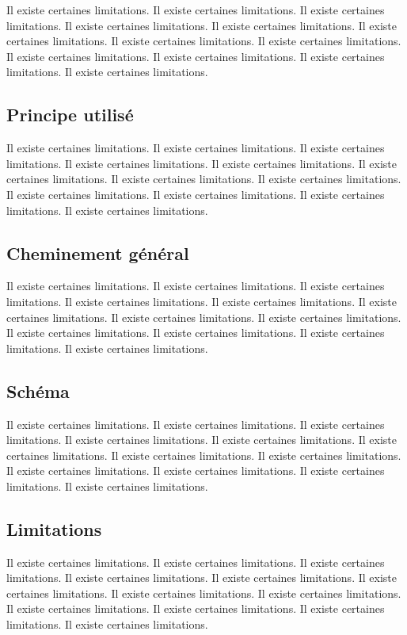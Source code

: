 \documentclass[11pt,a4paper,oneside]{report}
\begin{document}
Il existe certaines limitations.
Il existe certaines limitations.
Il existe certaines limitations.
Il existe certaines limitations.
Il existe certaines limitations.
Il existe certaines limitations.
Il existe certaines limitations.
Il existe certaines limitations.
Il existe certaines limitations.
Il existe certaines limitations.
Il existe certaines limitations.
Il existe certaines limitations.
\subsection{Principe utilisé}

Il existe certaines limitations.
Il existe certaines limitations.
Il existe certaines limitations.
Il existe certaines limitations.
Il existe certaines limitations.
Il existe certaines limitations.
Il existe certaines limitations.
Il existe certaines limitations.
Il existe certaines limitations.
Il existe certaines limitations.
Il existe certaines limitations.
Il existe certaines limitations.
\subsection{Cheminement général}

Il existe certaines limitations.
Il existe certaines limitations.
Il existe certaines limitations.
Il existe certaines limitations.
Il existe certaines limitations.
Il existe certaines limitations.
Il existe certaines limitations.
Il existe certaines limitations.
Il existe certaines limitations.
Il existe certaines limitations.
Il existe certaines limitations.
Il existe certaines limitations.
\subsection{Schéma}

Il existe certaines limitations.
Il existe certaines limitations.
Il existe certaines limitations.
Il existe certaines limitations.
Il existe certaines limitations.
Il existe certaines limitations.
Il existe certaines limitations.
Il existe certaines limitations.
Il existe certaines limitations.
Il existe certaines limitations.
Il existe certaines limitations.
Il existe certaines limitations.
\subsection{Limitations}

Il existe certaines limitations.
Il existe certaines limitations.
Il existe certaines limitations.
Il existe certaines limitations.
Il existe certaines limitations.
Il existe certaines limitations.
Il existe certaines limitations.
Il existe certaines limitations.
Il existe certaines limitations.
Il existe certaines limitations.
Il existe certaines limitations.
Il existe certaines limitations.
\end{document}
